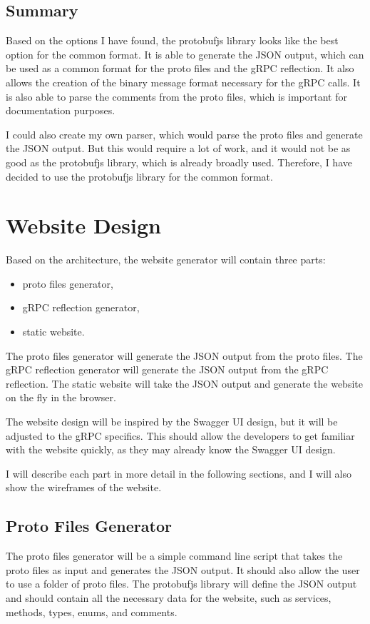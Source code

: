\subsection{Summary}

Based on the options I have found, the protobufjs library looks like the best option for the common format.
It is able to generate the JSON output, which can be used as a common format for the proto files and the gRPC reflection.
It also allows the creation of the binary message format necessary for the gRPC calls.
It is also able to parse the comments from the proto files, which is important for documentation purposes.

I could also create my own parser, which would parse the proto files and generate the JSON output.
But this would require a lot of work, and it would not be as good as the protobufjs library, which is already broadly used.
Therefore, I have decided to use the protobufjs library for the common format.


\section{Website Design}
Based on the architecture, the website generator will contain three parts:
\begin{itemize}
    \item proto files generator,
    \item gRPC reflection generator,
    \item static website.
\end{itemize}

The proto files generator will generate the JSON output from the proto files.
The gRPC reflection generator will generate the JSON output from the gRPC reflection.
The static website will take the JSON output and generate the website on the fly in the browser.

The website design will be inspired by the Swagger UI design, but it will be adjusted to the gRPC specifics.
This should allow the developers to get familiar with the website quickly, as they may already know the Swagger UI design.

I will describe each part in more detail in the following sections, and I will also show the wireframes of the website.

\subsection{Proto Files Generator}
The proto files generator will be a simple command line script that takes the proto files as input and generates the JSON output.
It should also allow the user to use a folder of proto files.
The protobufjs library will define the JSON output and should contain all the necessary data for the website, such as services, methods, types, enums, and comments.

